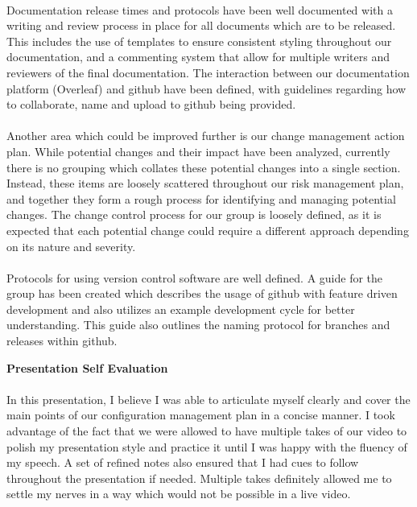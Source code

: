 \documentclass[11pt, a4paper]{article}
\begin{document}
	\paragraph{} {Documentation release times and protocols have been well documented with a writing and review process in place for all documents which are to be released. This includes the use of templates to ensure consistent styling throughout our documentation, and a commenting system that allow for multiple writers and reviewers of the final documentation. The interaction between our documentation platform (Overleaf) and github have been defined, with guidelines regarding how to collaborate, name and upload to github being provided.  }
	\paragraph{} {Another area which could be improved further is our change management action plan. While potential changes and their impact have been analyzed, currently there is no grouping which collates these potential changes into a single section. Instead, these items are loosely scattered throughout our risk management plan, and together they form a rough process for identifying and managing potential changes. The change control process for our group is loosely defined, as it is expected that each potential change could require a different approach depending on its nature and severity. }
	\paragraph{} {Protocols for using version control software are well defined. A guide for the group has been created which describes the usage of github with feature driven development and also utilizes an example development cycle for better understanding. This guide also outlines the naming protocol for branches and releases within github. }	
	
	\newpage
	\begin{center}
	\huge \bf Presentation Self Evaluation
	\end{center}
	\paragraph{} {In this presentation, I believe I was able to articulate myself clearly and cover the main points of our configuration management plan in a concise manner. I took advantage of the fact that we were allowed to have multiple takes of our video to polish my presentation style and practice it until I was happy with the fluency of my speech. A set of refined notes also ensured that I had cues to follow throughout the presentation if needed. Multiple takes definitely allowed me to settle my nerves in a way which would not be possible in a live video.}
	
\end{document}
